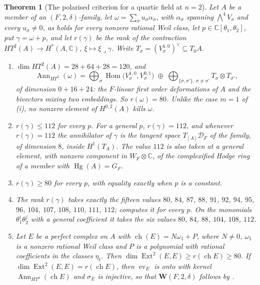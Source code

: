 \documentclass[11pt,reqno]{amsart}
\theoremstyle{plain}
\newtheorem{theorem}{Theorem}[section]
\theoremstyle{definition}
\theoremstyle{remark}
\newcommand{\CC}{\mathbb{C}}
\newcommand{\cD}{\mathcal{D}}
\DeclareMathOperator{\ch}{ch}
\DeclareMathOperator{\Hom}{Hom}
\DeclareMathOperator{\Ext}{Ext}
\DeclareMathOperator{\Hg}{Hg}
\DeclareMathOperator{\Ann}{Ann}
\begin{document}
\begin{theorem}[The polarised criterion for a quartic field at $n=2$]
\label{thm:quarticp2prime}
Let $A$ be a member of an $(F,2,\delta)$-family, let
$\omega=\sum_{\sigma}u_{\sigma}\alpha_{\sigma}$, with $\alpha_{\sigma}$ spanning
$\bigwedge^{4}V_{\sigma}$ and every $u_{\sigma}\ne0$, as holds for every
nonzero rational Weil class, let $p\in\CC[\theta_{1},\theta_{2}]$, put
$\gamma=\omega+p$, and let $r(\gamma)$ be the rank of the contraction
$HT^{2}(A)\to H^{*}(A,\CC)$, $\xi\mapsto\xi\lrcorner\gamma$. Write
$T_{\sigma}=(V_{\sigma}^{1,0})^{\vee}\subseteq T_{0}A$.
\begin{enumerate}[label=\textup{(\roman*)},leftmargin=2.6em,itemsep=2pt]
\item $\dim HT^{2}(A)=28+64+28=120$, and
  \[
    \Ann_{HT^{2}}(\omega)=\textstyle\bigoplus_{\sigma}
    \Hom\bigl(V_{\sigma}^{1,0},V_{\sigma}^{0,1}\bigr)\;\oplus\;
    \bigoplus_{\{\sigma,\sigma'\},\,\sigma\ne\sigma'}T_{\sigma}\otimes T_{\sigma'},
  \]
  of dimension $0+16+24$: the $F$-linear first order deformations of $A$ and
  the bivectors mixing two embeddings. So $r(\omega)=80$. Unlike the case
  $m=1$ of (i), no nonzero element of $H^{0,2}(A)$ kills
  $\omega$.
\item $r(\gamma)\le112$ for every $p$. For a general $p$, $r(\gamma)=112$, and
  whenever $r(\gamma)=112$ the annihilator of $\gamma$ is the tangent space
  $T_{[A]}\cD_{F}$ of the family, of dimension $8$, inside $H^{1}(T_{A})$. The
  value $112$ is also taken at a general element, with nonzero component in
  $W_{F}\otimes\CC$, of the complexified Hodge ring of a member with
  $\Hg(A)=G_{F}$.
\item $r(\gamma)\ge80$ for every $p$, with equality exactly when $p$ is a
  constant.
\item The rank $r(\gamma)$ takes exactly the fifteen values $80$, $84$, $87$,
  $88$, $91$, $92$, $94$, $95$, $96$, $104$, $107$, $108$, $110$, $111$,
  $112$;  computes it for every $p$. On the monomials
  $\theta_{1}^{i}\theta_{2}^{j}$ with a general coefficient it takes the
  six values $80$, $84$, $88$, $104$, $108$, $112$.
\item Let $E$ be a perfect complex on $A$ with $\ch(E)=N\omega_{1}+P$, where
  $N\ne0$, $\omega_{1}$ is a nonzero rational Weil class and $P$ is a
  polynomial with rational coefficients in the classes $\eta_{t}$. Then
  $\dim\Ext^{2}(E,E)\ge r(\ch E)\ge80$. If $\dim\Ext^{2}(E,E)=r(\ch E)$, then
  $\operatorname{ev}_{E}$ is onto with kernel $\Ann_{HT^{2}}(\ch E)$ and
  $\sigma_{E}$ is injective, so that $\mathbf{W}(F,2,\delta)$ follows by
  \cite[Theorem~17.7(v)]{paperI}.
\end{enumerate}
\end{theorem}
\end{document}
